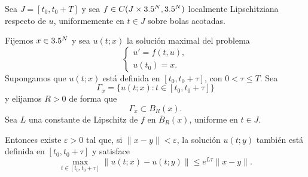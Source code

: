 \begin{teorema}
    Sea $J=[t_0,t_0+T]$ y sea $f\in C(J\times3.5^N,3.5^N)$ localmente Lipschitziana respecto de $u$, uniformemente en $t\in J$ sobre bolas acotadas.

    Fijemos $x\in3.5^N$ y sea $u(t;x)$ la solución maximal del problema
    \[
        \begin{cases}
            u'=f(t,u),\\
            u(t_0)=x.
        \end{cases}
    \]
    Supongamos que $u(t;x)$ está definida en $[t_0,t_0+\tau]$, con $0<\tau\leq T$. Sea
    \[
        \Gamma_x=\{u(t;x):t\in[t_0,t_0+\tau]\}
    \]
    y elijamos $R>0$ de forma que
    \[
        \Gamma_x\subset B_R(x).
    \]
    Sea $L$ una constante de Lipschitz de $f$ en $\overline{B}_R(x)$, uniforme en $t\in J$.

    Entonces existe $\varepsilon>0$ tal que, si $\|x-y\|<\varepsilon$, la solución $u(t;y)$ también está definida en $[t_0,t_0+\tau]$ y satisface
    \[
        \max_{t\in[t_0,t_0+\tau]}
        \|u(t;x)-u(t;y)\|
        \leq e^{L\tau}\|x-y\|.
    \]
\end{teorema}


